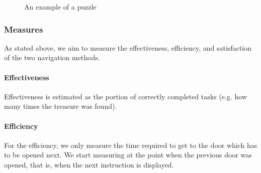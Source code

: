 \documentclass{sig-alternate-05-2015}
\begin{document}
\begin{figure}
\caption{An example of a puzzle}
\end{figure}
\subsubsection{Measures}
As stated above, we aim to measure the effectiveness, efficiency, and satisfaction of the two navigation methods. 
\paragraph{Effectiveness} Effectiveness is estimated as the portion of
correctly completed tasks (e.g. how many times the treasure was found). 
\paragraph{Efficiency} For the efficiency, we only measure the time required to get to the door which has to be opened next. We start measuring at the point
when the previous door was opened, that is, when the next instruction is displayed.
\end{document}
